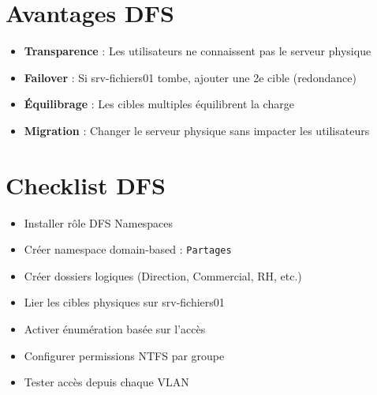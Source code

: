 \section{Avantages DFS}

\begin{itemize}
    \item \textbf{Transparence} : Les utilisateurs ne connaissent pas le serveur physique
    \item \textbf{Failover} : Si srv-fichiers01 tombe, ajouter une 2e cible (redondance)
    \item \textbf{Équilibrage} : Les cibles multiples équilibrent la charge
    \item \textbf{Migration} : Changer le serveur physique sans impacter les utilisateurs
\end{itemize}

\section{Checklist DFS}

\begin{itemize}
    \item[\checkmark] Installer rôle DFS Namespaces
    \item[\checkmark] Créer namespace domain-based : \texttt{Partages}
    \item[\checkmark] Créer dossiers logiques (Direction, Commercial, RH, etc.)
    \item[\checkmark] Lier les cibles physiques sur srv-fichiers01
    \item[\checkmark] Activer énumération basée sur l'accès
    \item[\checkmark] Configurer permissions NTFS par groupe
    \item[\checkmark] Tester accès depuis chaque VLAN
\end{itemize}
